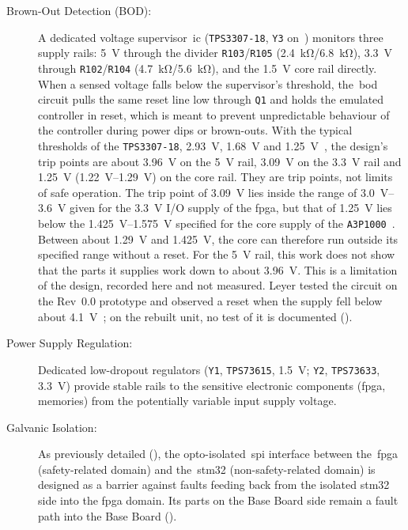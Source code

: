 \begin{description}
	\item[Brown-Out Detection (BOD):] A dedicated voltage supervisor~\gls{ic} (\texttt{TPS3307-18}, \texttt{Y3} on~) monitors three supply rails: \SI{5}{\volt} through the divider \texttt{R103}/\texttt{R105} (\SI{2.4}{\kilo\ohm}/\SI{6.8}{\kilo\ohm}), \SI{3.3}{\volt} through \texttt{R102}/\texttt{R104} (\SI{4.7}{\kilo\ohm}/\SI{5.6}{\kilo\ohm}), and the \SI{1.5}{\volt} core rail directly. When a sensed voltage falls below the supervisor's threshold, the~\gls{bod} circuit pulls the same reset line low through \texttt{Q1} and holds the emulated controller in reset, which is meant to prevent unpredictable behaviour of the controller during power dips or brown-outs. With the typical thresholds of the \texttt{TPS3307-18}, \SI{2.93}{\volt}, \SI{1.68}{\volt} and \SI{1.25}{\volt}~\cite[pp.~2, 6]{ti_tps3307}, the design's trip points are about \SI{3.96}{\volt} on the \SI{5}{\volt} rail, \SI{3.09}{\volt} on the \SI{3.3}{\volt} rail and \SI{1.25}{\volt} (\SIrange{1.22}{1.29}{\volt}) on the core rail. They are trip points, not limits of safe operation. The trip point of \SI{3.09}{\volt} lies inside the range of \SIrange{3.0}{3.6}{\volt} given for the \SI{3.3}{\volt} I/O supply of the \gls{fpga}, but that of \SI{1.25}{\volt} lies below the \SIrange{1.425}{1.575}{\volt} specified for the core supply of the \texttt{A3P1000}~\cite[Table~7]{microsemi_ds0106}. Between about \SI{1.29}{\volt} and \SI{1.425}{\volt}, the core can therefore run outside its specified range without a reset. For the \SI{5}{\volt} rail, this work does not show that the parts it supplies work down to about \SI{3.96}{\volt}. This is a limitation of the design, recorded here and not measured. Leyer tested the circuit on the Rev~0.0 prototype and observed a reset when the supply fell below about \SI{4.1}{\volt}~\cite[Sec.~4.7]{leyer2023}; on the rebuilt unit, no test of it is documented ().
	\item[Power Supply Regulation:] Dedicated low-dropout regulators (\texttt{Y1}, \texttt{TPS73615}, \SI{1.5}{\volt}; \texttt{Y2}, \texttt{TPS73633}, \SI{3.3}{\volt}) provide stable rails to the sensitive electronic components (\gls{fpga}, memories) from the potentially variable input supply voltage.
	\item[Galvanic Isolation:] As previously detailed (), the opto-isolated~\gls{spi} interface between the~\gls{fpga} (safety-related domain) and the~\gls{stm32} (non-safety-related domain) is designed as a barrier against faults feeding back from the isolated \gls{stm32} side into the \gls{fpga} domain. Its parts on the Base Board side remain a fault path into the Base Board ().

\end{description}
